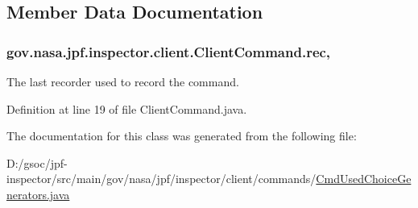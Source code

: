 \subsection{Member Data Documentation}
\subsubsection[{\texorpdfstring{rec}{rec}}]{ gov.\+nasa.\+jpf.\+inspector.\+client.\+Client\+Command.\+rec\hspace{0.3cm}{\ttfamily [protected]}, {\ttfamily [inherited]}}\hypertarget{classgov_1_1nasa_1_1jpf_1_1inspector_1_1client_1_1_client_command_af4246f2427035c72a6af45a2c61361f7}{}\label{classgov_1_1nasa_1_1jpf_1_1inspector_1_1client_1_1_client_command_af4246f2427035c72a6af45a2c61361f7}


The last recorder used to record the command. 



Definition at line 19 of file Client\+Command.\+java.



The documentation for this class was generated from the following file\+:\begin{DoxyCompactItemize}
\item 
D\+:/gsoc/jpf-\/inspector/src/main/gov/nasa/jpf/inspector/client/commands/\hyperlink{_cmd_used_choice_generators_8java}{Cmd\+Used\+Choice\+Generators.\+java}\end{DoxyCompactItemize}
